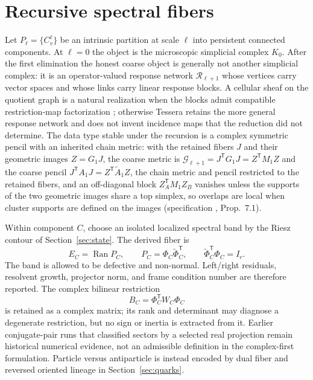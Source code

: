 \documentclass[11pt,letterpaper]{article}
\newcommand{\RN}{\mathcal{R}}
\begin{document}
\section{Recursive spectral fibers}\label{sec:fibers}

Let $P_{\ell}=\{C_{v}^{\ell}\}$ be an intrinsic partition at scale $\ell$ into
persistent connected components. At $\ell=0$ the object is the microscopic
simplicial complex $K_{0}$. After the first elimination the honest coarse
object is generally not another simplicial complex: it is an operator-valued
response network $\RN_{\ell+1}$ whose vertices carry vector spaces and whose
links carry linear response blocks. A cellular sheaf on the quotient graph is a
natural realization when the blocks admit compatible restriction-map
factorization \cite{hansenghrist2019}; otherwise Tessera retains the more
general response network and does not invent incidence maps that the reduction
did not determine. The data type stable under the recursion is a complex
symmetric pencil with an inherited chain metric: with the retained fibers
$J$ and their geometric images $Z=G_1J$, the coarse metric is
$\mathcal G_{\ell+1}=J^{\mathsf T}G_1J=Z^{\mathsf T}M_1Z$ and the coarse pencil
$J^{\mathsf T}A_1J=Z^{\mathsf T}\tilde A_1Z$, the chain metric and pencil
restricted to the retained fibers, and an off-diagonal block
$Z_A^{\mathsf T}M_1Z_B$ vanishes unless the supports of the two geometric images
share a top simplex, so overlaps are local when cluster supports are defined
on the images (specification \cite{whitneyspec}, Prop.~7.1).

Within component $C$, choose an isolated localized spectral band by the Riesz
contour of Section~\ref{sec:state}. The derived fiber is
\begin{equation*}
  E_C=\operatorname{Ran}P_C,\qquad
  P_C=\Phi_C\widetilde\Phi_C^{\mathsf T},\qquad
  \widetilde\Phi_C^{\mathsf T}\Phi_C=I_r .
\end{equation*}
The band is allowed to be defective and non-normal. Left/right residuals,
resolvent growth, projector norm, and frame condition number are therefore
reported. The complex bilinear restriction
\begin{equation*}
  B_C=\Phi_C^{\mathsf T}W_C\Phi_C
\end{equation*}
is retained as a complex matrix; its rank and determinant may diagnose a
degenerate restriction, but no sign or inertia is extracted from it. Earlier
conjugate-pair runs that classified sectors by a selected real projection
remain historical numerical evidence, not an admissible definition in the
complex-first formulation. Particle versus antiparticle is instead encoded by
dual fiber and reversed oriented lineage in Section~\ref{sec:quarks}.
\end{document}
